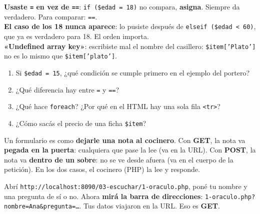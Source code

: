 \begin{errores}
\textbf{Usaste \texttt{=} en vez de \texttt{==}}: \texttt{if (\$edad = 18)} no compara, \textbf{asigna}. Siempre da verdadero. Para comparar: \texttt{==}.\\[1mm]
\textbf{El caso de los 18 nunca aparece}: lo pusiste después de \texttt{elseif (\$edad < 60)}, que ya es verdadero para 18. El orden importa.\\[1mm]
\textbf{«Undefined array key»}: escribiste mal el nombre del casillero: \texttt{\$item['Plato']} no es lo mismo que \texttt{\$item['plato']}.
\end{errores}

\begin{comprueba}
\begin{enumerate}
  \item Si \texttt{\$edad = 15}, ¿qué condición se cumple primero en el ejemplo del portero?
  \item ¿Qué diferencia hay entre \texttt{=} y \texttt{==}?
  \item ¿Qué hace \texttt{foreach}? ¿Por qué en el HTML hay una sola fila \texttt{<tr>}?
  \item ¿Cómo sacás el precio de una ficha \texttt{\$item}?
\end{enumerate}
\end{comprueba}


\begin{analogia}
Un formulario es como \textbf{dejarle una nota al cocinero}. Con \textbf{GET}, la nota va \textbf{pegada en la puerta}: cualquiera
que pase la lee (va en la URL). Con \textbf{POST}, la nota va \textbf{dentro de un sobre}: no se ve desde afuera (va en el cuerpo
de la petición). En los dos casos, el cocinero (PHP) la lee y responde.
\end{analogia}

Abrí \texttt{http://localhost:8090/03-escuchar/1-oraculo.php}, poné tu nombre y una pregunta de sí o no.
Ahora \textbf{mirá la barra de direcciones}: \texttt{1-oraculo.php?nombre=Ana\&pregunta=\ldots}. Tus datos viajaron en la URL. Eso es \textbf{GET}.

